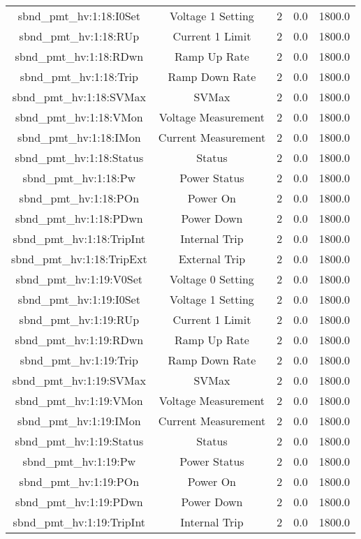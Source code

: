 \begin{table}[ptb]
\begin{tabular}{c | c c c c}
sbnd_pmt_hv:1:18:I0Set & Voltage 1 Setting & 2 & 0.0 & 1800.0\\ 
sbnd_pmt_hv:1:18:RUp & Current 1 Limit & 2 & 0.0 & 1800.0\\ 
sbnd_pmt_hv:1:18:RDwn & Ramp Up Rate & 2 & 0.0 & 1800.0\\ 
sbnd_pmt_hv:1:18:Trip & Ramp Down Rate & 2 & 0.0 & 1800.0\\ 
sbnd_pmt_hv:1:18:SVMax & SVMax & 2 & 0.0 & 1800.0\\ 
sbnd_pmt_hv:1:18:VMon & Voltage Measurement & 2 & 0.0 & 1800.0\\ 
sbnd_pmt_hv:1:18:IMon & Current Measurement & 2 & 0.0 & 1800.0\\ 
sbnd_pmt_hv:1:18:Status & Status & 2 & 0.0 & 1800.0\\ 
sbnd_pmt_hv:1:18:Pw & Power Status & 2 & 0.0 & 1800.0\\ 
sbnd_pmt_hv:1:18:POn & Power On & 2 & 0.0 & 1800.0\\ 
sbnd_pmt_hv:1:18:PDwn & Power Down & 2 & 0.0 & 1800.0\\ 
sbnd_pmt_hv:1:18:TripInt & Internal Trip & 2 & 0.0 & 1800.0\\ 
sbnd_pmt_hv:1:18:TripExt & External Trip & 2 & 0.0 & 1800.0\\ 
sbnd_pmt_hv:1:19:V0Set & Voltage 0 Setting & 2 & 0.0 & 1800.0\\ 
sbnd_pmt_hv:1:19:I0Set & Voltage 1 Setting & 2 & 0.0 & 1800.0\\ 
sbnd_pmt_hv:1:19:RUp & Current 1 Limit & 2 & 0.0 & 1800.0\\ 
sbnd_pmt_hv:1:19:RDwn & Ramp Up Rate & 2 & 0.0 & 1800.0\\ 
sbnd_pmt_hv:1:19:Trip & Ramp Down Rate & 2 & 0.0 & 1800.0\\ 
sbnd_pmt_hv:1:19:SVMax & SVMax & 2 & 0.0 & 1800.0\\ 
sbnd_pmt_hv:1:19:VMon & Voltage Measurement & 2 & 0.0 & 1800.0\\ 
sbnd_pmt_hv:1:19:IMon & Current Measurement & 2 & 0.0 & 1800.0\\ 
sbnd_pmt_hv:1:19:Status & Status & 2 & 0.0 & 1800.0\\ 
sbnd_pmt_hv:1:19:Pw & Power Status & 2 & 0.0 & 1800.0\\ 
sbnd_pmt_hv:1:19:POn & Power On & 2 & 0.0 & 1800.0\\ 
sbnd_pmt_hv:1:19:PDwn & Power Down & 2 & 0.0 & 1800.0\\ 
sbnd_pmt_hv:1:19:TripInt & Internal Trip & 2 & 0.0 & 1800.0\\ 

\end{tabular}
\end{table}
